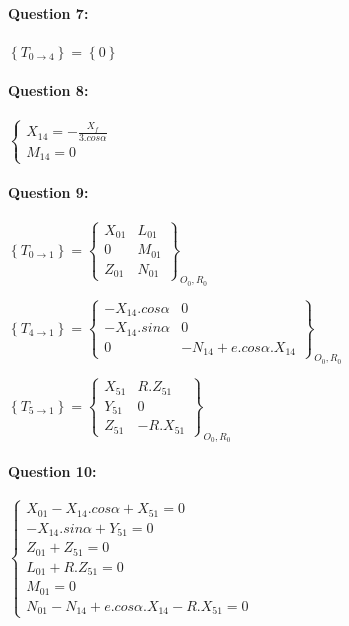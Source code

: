 \paragraph{Question 7:}

$\left\{T_{0\rightarrow 4}\right\}=\left\{0\right\}$

\paragraph{Question 8:}

$\left\{\begin{array}{l}
X_{14}=-\frac{X_f}{3.cos\alpha} \\
M_{14}=0
\end{array}\right.$

\paragraph{Question 9:}

$\left\{T_{0\rightarrow 1}\right\}=\left\{\begin{array}{cc}
X_{01} & L_{01} \\ 0 & M_{01} \\ Z_{01} & N_{01}
\end{array}\right\}_{O_0,R_0}$

$\left\{T_{4\rightarrow 1}\right\}=\left\{\begin{array}{cc}
-X_{14}.cos\alpha & 0 \\ -X_{14}.sin\alpha & 0 \\ 0 & -N_{14}+e.cos\alpha.X_{14}
\end{array}\right\}_{O_0,R_0}$

$\left\{T_{5\rightarrow 1}\right\}=\left\{\begin{array}{cc}
X_{51} & R.Z_{51} \\ Y_{51} & 0 \\ Z_{51} & -R.X_{51}
\end{array}\right\}_{O_0,R_0}$

\paragraph{Question 10:}

$\left\{\begin{array}{l}
X_{01}-X_{14}.cos\alpha+X_{51}=0 \\
-X_{14}.sin\alpha+Y_{51}=0 \\
Z_{01}+Z_{51}=0 \\
L_{01}+R.Z_{51}=0 \\
M_{01}=0 \\
N_{01}-N_{14}+e.cos\alpha.X_{14}-R.X_{51}=0
\end{array}\right.$

